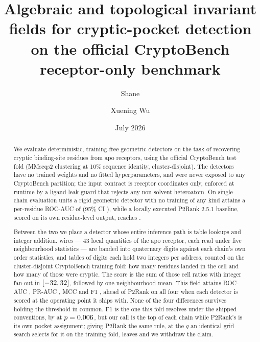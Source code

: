 \documentclass[11pt]{article}
\title{Algebraic and topological invariant fields for cryptic-pocket detection\\
on the official CryptoBench receptor-only benchmark}
\author{Shane \and Xuening Wu}
\date{July 2026}
\begin{document}
\maketitle

\begin{abstract}
We evaluate deterministic, training-free geometric detectors on the task of
recovering cryptic binding-site residues from apo receptors, using the official
CryptoBench test fold (MMseqs2 clustering at 10\% sequence identity,
cluster-disjoint). The detectors have no trained weights and no fitted
hyperparameters, and were never exposed to any CryptoBench partition; the input
contract is receptor coordinates only, enforced at runtime by a ligand-leak
guard that rejects any non-solvent heteroatom. On \NUnits{} single-chain
evaluation units a rigid geometric detector with no training of any kind attains
a per-residue ROC-AUC of \GeoAuc{} (95\% CI \GeoAucCI{}), while a locally
executed P2Rank 2.5.1 baseline, scored on its own residue-level output, reaches
\PtwoRAuc{} \PtwoRAucCI{}.

Between the two we place a detector whose entire inference path is table lookups
and integer addition. \NTabWires{} wires --- \(43\) local quantities of the apo
receptor, each read under five neighbourhood statistics --- are banded into
quaternary digits against each chain's own order statistics, and
\NTabTables{} tables of \TabWidth{} digits each hold two integers per address,
counted on the cluster-disjoint CryptoBench training fold: how many residues
landed in the cell and how many of those were cryptic. The score is the sum of
those cell ratios with integer fan-out in \([-32{}, 32{}]\), followed
by one neighbourhood mean. This field attains ROC-AUC \TabAuc{} \TabAucCI{},
PR-AUC \TabPr{} \TabPrCI{}, MCC \TabMcc{} \TabMccCI{} and F1 \TabFOne{}
\TabFOneCI{}, ahead of P2Rank on all four when each detector is scored at the
operating point it ships with. None of the four differences survives holding the
threshold in common. F1 is the one this fold resolves under the shipped
conventions, by \TabFOneD{} \TabFOneDCI{} at \(p=0.006{}\), but our call is
the top \MatchOurQ{} of each chain while P2Rank's is its own pocket assignment;
giving P2Rank the same rule, at the \(q\) an identical grid search selects for it
on the training fold, leaves \MatchBDelta{} \MatchBCI{} and we withdraw the
claim.


\end{abstract}
\end{document}
